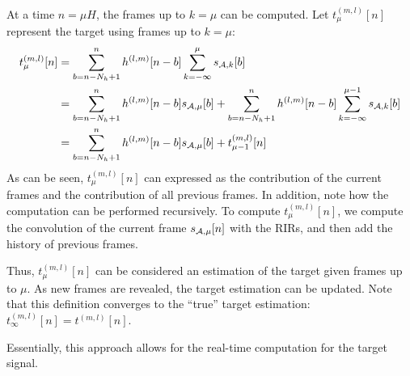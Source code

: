 At a time $n = \mu H$, the frames up to $k = \mu$ can be computed.
Let $t_\mu^{(m,l)}[n]$ represent the target using frames up to $k = \mu$:  
\begin{align}
    t_\mu^{(m,l)}[n] &= \sum_{b = n - N_h + 1}^{n} h^{(l,m)}[n - b] 
                        \sum_{k=-\infty}^{\mu} s_{\mathcal{A},k}[b] \\
                     &= \sum_{b = n - N_h + 1}^{n} h^{(l,m)}[n - b] 
                        s_{\mathcal{A},\mu}[b] + \sum_{b = n - N_h + 1}^{n} h^{(l,m)}[n - b] 
                        \sum_{k=-\infty}^{\mu - 1} s_{\mathcal{A}, k}[b] \\
                     &= \sum_{b = n - N_h + 1}^{n} h^{(l,m)}[n - b] 
                        s_{\mathcal{A}, \mu}[b] + t_{\mu - 1}^{(m,l)}[n]
\end{align}
As can be seen, $t_\mu^{(m,l)}[n]$ can expressed as the contribution of the current frames and the contribution of all previous frames.
In addition, note how the computation can be performed recursively.
To compute $t_\mu^{(m,l)}[n]$, we compute the convolution of the current frame $s_{\mathcal{A}, \mu}[n]$ with the RIRs, 
and then add the history of previous frames.

Thus, $t_\mu^{(m,l)}[n]$ can be considered an estimation of the target given frames up to $\mu$. 
As new frames are revealed, the target estimation can be updated.
Note that this definition converges to the ``true'' target estimation: $t_\infty^{(m,l)}[n] = t^{(m,l)}[n]$. 

Essentially, this approach allows for the real-time computation for the target signal.

